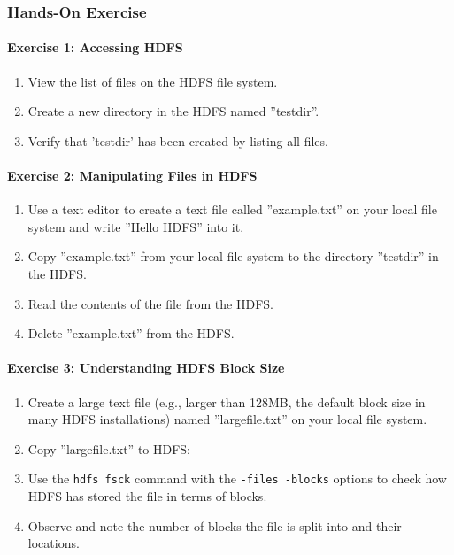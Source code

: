 \begin{tcolorbox}[colback=code]
\subsubsection*{Hands-On Exercise} 

\paragraph*{Exercise 1: Accessing HDFS}

\begin{enumerate}
  \item View the list of files on the HDFS file system.
  \item Create a new directory in the HDFS named ''testdir''.
  \item Verify that 'testdir' has been created by listing all files.
\end{enumerate}

\paragraph*{Exercise 2: Manipulating Files in HDFS}

\begin{enumerate}
  \item Use a text editor to create a text file called ''example.txt'' on your local file system and write ''Hello HDFS'' into it.
  \item Copy ''example.txt'' from your local file system to the directory ''testdir'' in the HDFS.
  \item Read the contents of the file from the HDFS.
  \item Delete ''example.txt'' from the HDFS.
\end{enumerate}

\paragraph*{Exercise 3: Understanding HDFS Block Size}

\begin{enumerate}
  \item Create a large text file (e.g., larger than 128MB, the default block size in many HDFS installations) named ''largefile.txt'' on your local file system.
  \item Copy ''largefile.txt'' to HDFS:
  \item Use the \texttt{hdfs fsck} command with the \texttt{-files -blocks} options to check how HDFS has stored the file in terms of blocks.
  \item Observe and note the number of blocks the file is split into and their locations.
\end{enumerate}

\end{tcolorbox}

